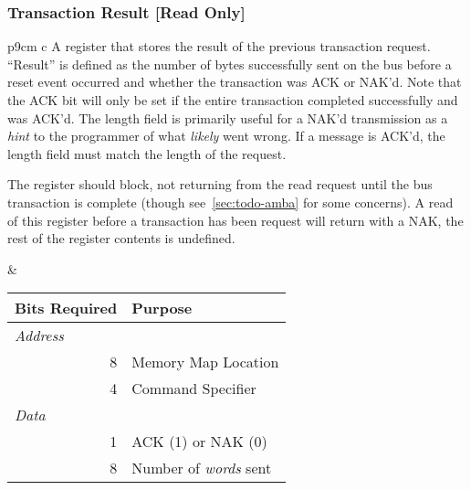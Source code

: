 \subsubsection{Transaction Result [Read Only]}
\label{reg-tx-result}
\begin{tabular}{p{9cm} c}
\vspace{-4em}
A register that stores the result of the previous transaction request.
``Result'' is defined as the number of bytes successfully sent on the bus
before a reset event occurred and whether the transaction was ACK or NAK'd.
Note that the ACK bit will only be set if the entire transaction completed
successfully and was ACK'd. The length field is primarily useful for a NAK'd
transmission as a {\em hint} to the programmer of what {\em likely} went
wrong. If a message is ACK'd, the length field must match the length of the
request.

The register should block, not returning from the read request until the bus
transaction is complete (though see~\ref{sec:todo-amba} for some concerns). A
read of this register before a transaction has been request will return with a
NAK, the rest of the register contents is undefined.

&

\begin{tabular}{r l}
  Bits Required & Purpose \\
  \hline
  \hline
  \multicolumn{1}{l}{\em Address} & \\
  8 & \bus Memory Map Location \\
  4 & Command Specifier \\
  \multicolumn{1}{l}{\em Data} & \\
  1 & ACK (1) or NAK (0) \\
  8 & Number of {\em words} sent \\
\end{tabular}

\\
\end{tabular}

